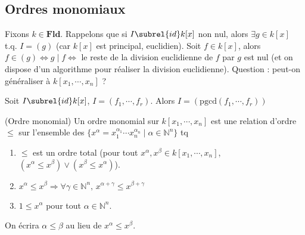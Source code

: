         \subsection{Ordres monomiaux}
            Fixons $k \in \mathbf{Fld}$. Rappelons que si $I \subrel{id} k[x]$ non nul, alors $\exists g \in k[x]$ t.q. $I = (g)$ (car $k[x]$ est principal, euclidien). Soit $f \in k[x]$, alors $f \in (g) \iff g \mid f \iff $ le reste de la division euclidienne de $f$ par $g$ est nul (et on dispose d'un algorithme pour réaliser la division euclidienne). Question : peut-on généraliser à $k[x_1, \cdots, x_n]$ ? 
            \begin{remq}
                Soit $I \subrel{id} k[x]$, $I = (f_1, \cdots, f_r)$. Alors $I = (\mathrm{pgcd}(f_1, \cdots, f_r))$
            \end{remq}
            \begin{defi} (Ordre monomial)
                \label{ordre_mono}
                Un ordre monomial sur $k[x_1, \cdots, x_n]$ est une relation d'ordre $\leq$ sur l'ensemble des $\{x^\alpha = x_1^{\alpha_1} \cdots x_n^{\alpha_n} \mid \alpha \in \mathbb{N}^n\}$ tq
                \begin{enumerate}
                    \item $\leq$ est un ordre total (pour tout $x^\alpha, x^\beta \in k[x_1, \cdots, x_n]$, $(x^\alpha \leq x^\beta) \lor (x^\beta \leq x^\alpha)$).
                    \item $x^\alpha \leq x^\beta \Rightarrow \forall \gamma \in \mathbb{N}^n,\, x^{\alpha + \gamma} \leq x^{\beta + \gamma}$
                    \item $1 \leq x^\alpha$ pour tout $\alpha \in \mathbb{N}^n$.
                \end{enumerate}
            \end{defi}
            \begin{nota}
                On écrira $\alpha \leq \beta$ au lieu de $x^\alpha \leq x^\beta$.
            \end{nota}
